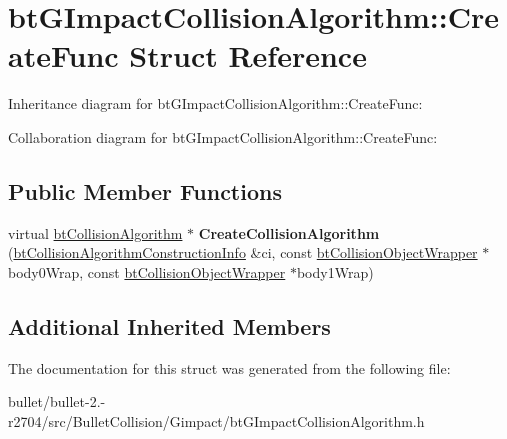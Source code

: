 \hypertarget{structbt_g_impact_collision_algorithm_1_1_create_func}{\section{bt\+G\+Impact\+Collision\+Algorithm\+:\+:Create\+Func Struct Reference}
\label{structbt_g_impact_collision_algorithm_1_1_create_func}
}


Inheritance diagram for bt\+G\+Impact\+Collision\+Algorithm\+:\+:Create\+Func\+:


Collaboration diagram for bt\+G\+Impact\+Collision\+Algorithm\+:\+:Create\+Func\+:
\subsection*{Public Member Functions}
\begin{DoxyCompactItemize}
\item 
\hypertarget{structbt_g_impact_collision_algorithm_1_1_create_func_a61204984d563abeb3ffd09e7602240c1}{virtual \hyperlink{classbt_collision_algorithm}{bt\+Collision\+Algorithm} $\ast$ {\bfseries Create\+Collision\+Algorithm} (\hyperlink{structbt_collision_algorithm_construction_info}{bt\+Collision\+Algorithm\+Construction\+Info} \&ci, const \hyperlink{structbt_collision_object_wrapper}{bt\+Collision\+Object\+Wrapper} $\ast$body0\+Wrap, const \hyperlink{structbt_collision_object_wrapper}{bt\+Collision\+Object\+Wrapper} $\ast$body1\+Wrap)}\label{structbt_g_impact_collision_algorithm_1_1_create_func_a61204984d563abeb3ffd09e7602240c1}

\end{DoxyCompactItemize}
\subsection*{Additional Inherited Members}


The documentation for this struct was generated from the following file\+:\begin{DoxyCompactItemize}
\item 
bullet/bullet-\/2.-\/r2704/src/\+Bullet\+Collision/\+Gimpact/bt\+G\+Impact\+Collision\+Algorithm.\+h\end{DoxyCompactItemize}
